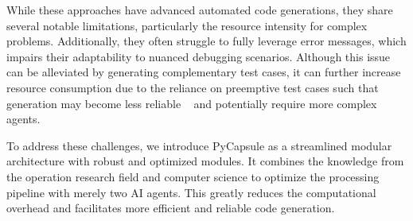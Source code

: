 While these approaches have advanced automated code generations, they share several notable limitations, particularly the resource intensity for complex problems. 
Additionally, they often struggle to fully leverage error messages, which impairs their adaptability to nuanced debugging scenarios. 
Although this issue can be alleviated by generating complementary test cases, it can further increase resource consumption due to the reliance on preemptive test cases such that generation may become less reliable ~\cite{software_testing, li2024largelanguagemodelstest} and potentially require more complex agents.

To address these challenges, we introduce PyCapsule as a streamlined modular architecture with robust and optimized modules. 
It combines the knowledge from the operation research field and computer science to optimize the processing pipeline with merely two AI agents. This greatly reduces the computational overhead and facilitates more efficient and reliable code generation.
